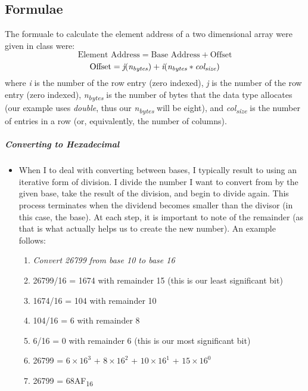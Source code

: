 \documentclass[12pt]{article}
\begin{document}
\subsection{Formulae}
The formuale to calculate the element address of a two dimensional array were given in class were:
\begin{equation}
\text{Element Address} = \text{Base Address} + \text{Offset}
\end{equation}
\begin{equation}
\text{Offset} = \textit{j}(\textit{n\textsubscript{bytes}}) + \textit{i}(\textit{n\textsubscript{bytes}}*\textit{col\textsubscript{size}})
\end{equation}
where \textit{i} is the number of the row entry (zero indexed), \textit{j} is the number of the row entry (zero indexed), \textit{n\textsubscript{bytes}} is the number of bytes that the data type allocates (our example uses \textit{double}, thus our \textit{n\textsubscript{bytes}} will be eight), and \textit{col\textsubscript{size}} is the number of entries in a row (or, equivalently, the number of columns).
\subparagraph{Converting to Hexadecimal}
\begin{itemize}[leftmargin=1.5em]
\item[] When I to deal with converting between bases, I typically result to using an iterative form of division. I divide the number I want to convert from by the given base, take the result of the division, and begin to divide again. This process terminates when the dividend becomes smaller than the divisor (in this case, the base). At each step, it is important to note of the remainder (as that is what actually helps us to create the new number). An example follows:
\begin{enumerate}
\item[] \textit{Convert 26799 from base 10 to base 16}
\item 26799/16 = 1674 with remainder 15 (this is our least significant bit)
\item 1674/16 = 104 with remainder 10
\item 104/16 = 6 with remainder 8
\item 6/16 = 0 with remainder 6 (this is our most significant bit)
\item 26799 = $6\times16^3$ + $8\times16^2$ + $10\times16^1$ + $15\times16^0$
\item 26799 = 68AF\textsubscript{16}
\end{enumerate}
\end{itemize}
\end{document}
